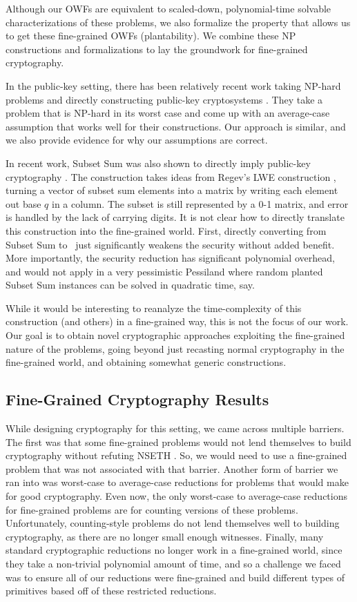 Although our OWFs are equivalent to scaled-down, polynomial-time solvable characterizations of these problems, we also formalize the property that allows us to get these fine-grained OWFs (plantability). We combine these NP constructions and formalizations to lay the groundwork for fine-grained cryptography.

In the public-key setting, there has been relatively recent work taking NP-hard problems and directly constructing public-key cryptosystems \cite{ABW10}. They take a problem that is NP-hard in its worst case and come up with an average-case assumption that works well for their constructions. Our approach is similar, and we also provide evidence for why our assumptions are correct.

In recent work, Subset Sum was also shown to directly imply public-key cryptography \cite{LPS10}. The construction takes ideas from Regev's LWE construction \cite{Regev05}, turning a vector of subset sum elements into a matrix by writing each element out base $q$ in a column. The subset is still represented by a 0-1 matrix, and error is handled by the lack of carrying digits. It is not clear how to directly translate this construction into the fine-grained world. First, directly converting from Subset Sum to \kSum~just significantly weakens the security without added benefit. More importantly, the security reduction has significant polynomial overhead, and would not apply in a very pessimistic Pessiland where random planted Subset Sum instances can be solved in quadratic time, say.

While it would be interesting to reanalyze the time-complexity of this construction (and others) in a fine-grained way, this is not the focus of our work. Our goal is to obtain novel cryptographic approaches exploiting the fine-grained nature of the problems, going beyond just recasting normal cryptography in the fine-grained world, and obtaining somewhat generic constructions.

\subsection{Fine-Grained Cryptography Results}
While designing cryptography for this setting, we came across multiple barriers. The first was that some fine-grained problems would not lend themselves to build cryptography without refuting NSETH \cite{CarmosinoGIMPS16}. So, we would need to use a fine-grained problem that was not associated with that barrier. Another form of barrier we ran into was worst-case to average-case reductions for problems that would make for good cryptography. Even now, the only worst-case to average-case reductions for fine-grained problems are for counting versions of these problems. Unfortunately, counting-style problems do not lend themselves well to building cryptography, as there are no longer small enough witnesses. Finally, many standard cryptographic reductions no longer work in a fine-grained world, since they take a non-trivial polynomial amount of time, and so a challenge we faced was to ensure all of our reductions were fine-grained and build different types of primitives based off of these restricted reductions.

